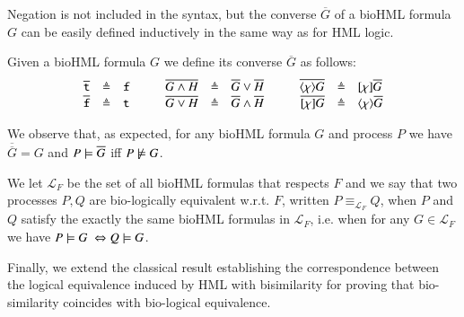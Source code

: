 Negation is not included in the syntax, but the converse $\overline{G}$ of a bioHML formula $G$ can be easily defined inductively in the same way as for HML logic.

\begin{definition}[converse]
Given a bioHML formula $G$ we define its converse $\overline{G}$ as follows:
\[
\begin{array}{rcl@{\hspace{1cm}}rcl@{\hspace{1cm}}rcl}
\overline{\tt t} & \defeq & {\tt f} &
\overline{G \wedge H} & \defeq & \overline{G} \vee \overline{H} &
\overline{\langle \chi \rangle G} & \defeq & [\chi]\overline{G}
\\
\overline{\tt f} & \defeq & {\tt t} &
\overline{G \vee H} & \defeq & \overline{G} \wedge \overline{H} &
\overline{[\chi]G} & \defeq & \langle \chi \rangle\overline{G}
\end{array}
\]
\end{definition}

We observe that, as expected, for any bioHML formula $G$ and process $P$ we have $\overline{\overline{G}} = G$ and  $P \models \overline{G}$ iff  $P\not\models G$.

We let $\mathcal{L}_F$ be the set of all bioHML formulas that respects $F$ and 
we say that two processes $P,Q$ are bio-logically equivalent w.r.t. $F$, written $P \equiv_{\mathcal{L}_F}Q$, when $P$ and $Q$ satisfy the exactly the same bioHML formulas in $\mathcal{L}_F$, i.e. when for any $G\in \mathcal{L}_F$ we have $P \models G\ \Leftrightarrow Q \models G$.

Finally, we extend the classical result establishing the correspondence between the logical equivalence induced by HML with bisimilarity for proving that bio-similarity coincides with bio-logical equivalence.

